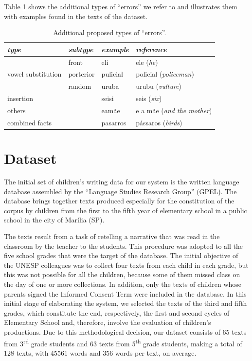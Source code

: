 Table \ref{tab_errors_add} shows the additional types of ``errors'' we refer to and illustrates them with examples found in the texts of the dataset.

\begin{table}[!ht]
\caption{Additional proposed types of ``errors''.}
\label{tab_errors_add}
\centering
\begin{small}
\begin{tabular}{llll}
\hline
\hline
\textit{type} & \textit{subtype} & \textit{example} & \textit{reference} \\
\hline
\multirow{3}{*}{vowel substitution}
& front     & eli      & ele (\textit{he}) \\
& porterior & pulicial & policial (\textit{policeman}) \\
& random    & uruba    & urubu (\textit{vulture}) \\
\hline
insertion      & & seisi & seis (\textit{six}) \\
\hline
others         & & eamãe & e a mãe (\textit{and the mother})\\
\hline
combined facts & & pasarros & pássaros (\textit{birds})\\
\hline
\hline
\end{tabular}
\end{small}
\end{table}


\section{Dataset}
The initial set of children's writing data for our system is the written language database assembled by the ``Language Studies Research Group'' (GPEL). The database \citep{Chacon2018} brings together texts produced especially for the constitution of the corpus by children from the first to the fifth year of elementary school in a public school in the city of Marília (SP).

The texts result from a task of retelling a narrative that was read in the classroom by the teacher to the students. This procedure was adopted to all the five school grades that were the target of the database. The initial objective of the UNESP colleagues was to collect four texts from each child in each grade, but this was not possible for all the children, because some of them missed class on the day of one or more collections. In addition, only the texts of children whose parents signed the Informed Consent Term were included in the database. In this initial stage of elaborating the system, we selected the texts of the third and fifth grades, which constitute the end, respectively, the first and second cycles of Elementary School and, therefore, involve the evaluation of children's productions. Due to this methodological decision, our dataset consists of 65 texts from 3\textsuperscript{rd} grade students and 63 texts from 5\textsuperscript{th} grade students, making a total of 128 texts, with 45561 words and 356 words per text, on average.


